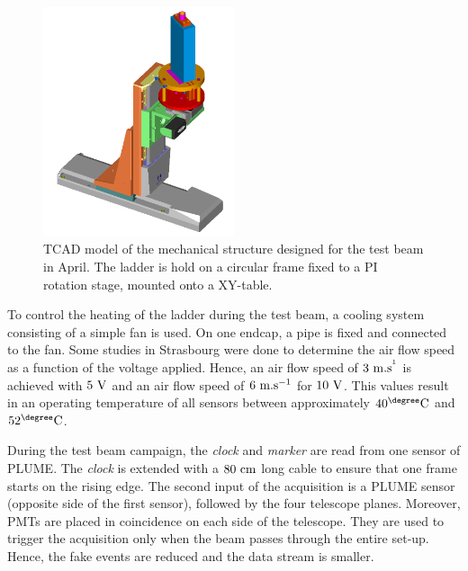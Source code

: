       \begin{figure}[!b]
        \centering
        \includegraphics[width = 0.5\textwidth]{Pictures/X0/Frame/Testbeam1.PNG}
        \caption{TCAD model of the mechanical structure designed for the test beam in April. The ladder is hold on a circular frame fixed to a PI rotation stage, mounted onto a XY-table.}
        \label{fig:mechanics}
      \end{figure}

      To control the heating of the ladder during the test beam, a cooling system consisting of a simple fan is used.
      On one endcap, a pipe is fixed and connected to the fan.
      Some studies in Strasbourg were done to determine the air flow speed as a function of the voltage applied.
      Hence, an air flow speed of $3~\rm{m.s^{^1}}$ is achieved with $5~\rm{V}$ and an air flow speed of $6~\rm{m.s^{-1}}$ for $10~\rm{V}$.
      This values result in an operating temperature of all sensors between approximately $40^{\degree}\rm{C}$ and $52^{\degree}\rm{C}$.

      During the test beam campaign, the \textit{clock} and \textit{marker} are read from one sensor of \gls{PLUME}.
      The \textit{clock} is extended with a $80~\rm{cm}$ long cable to ensure that one frame starts on the rising edge.
      The second input of the acquisition is a \gls{PLUME} sensor (opposite side of the first sensor), followed by the four telescope planes. 
      Moreover, \gls{PMT}s are placed in coincidence on each side of the telescope.
      They are used to trigger the acquisition only when the beam passes through the entire set-up.
      Hence, the fake events are reduced and the data stream is smaller.


